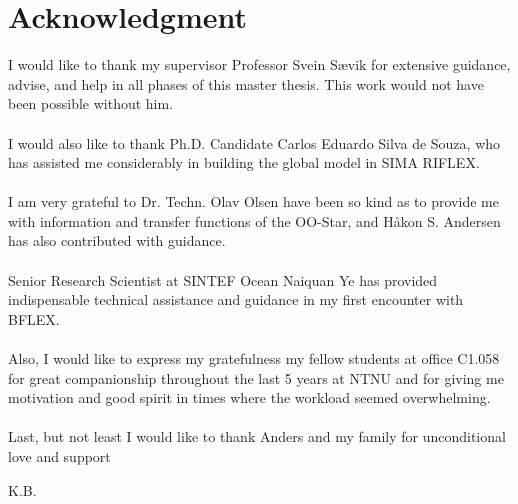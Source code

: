 \chapter*{Acknowledgment}
I would like to thank my supervisor Professor Svein Sævik for extensive guidance, advise, and help in all phases of this master thesis. This work would not have been possible without him. \\\\I would also like to thank Ph.D. Candidate Carlos Eduardo Silva de Souza, who has assisted me considerably in building the global model in SIMA RIFLEX. \\\\  I am very grateful to Dr. Techn. Olav Olsen have been so kind as to provide me with information and transfer functions of the OO-Star, and Håkon S. Andersen has also contributed with guidance. \\\\ Senior Research Scientist at SINTEF Ocean Naiquan Ye has provided indispensable technical assistance and guidance in my first encounter with BFLEX. \\\\ Also, I would like to express my gratefulness my fellow students at office C1.058 for great companionship throughout the last 5 years at NTNU and for giving me motivation and good spirit in times where the workload seemed overwhelming. \\\\ Last, but not least I would like to thank Anders and my family for unconditional love and support


\newline
\newline
\newline

\begin{flushright}
K.B.
\end{flushright}